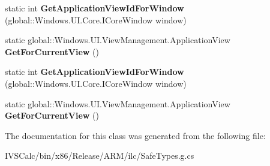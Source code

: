 \begin{DoxyCompactItemize}
\item 
\mbox{\label{class_windows_1_1_u_i_1_1_view_management_1_1_application_view_a676c20afecc52a042bd74db84f154257}} 
static int {\bfseries Get\+Application\+View\+Id\+For\+Window} (global\+::\+Windows.\+U\+I.\+Core.\+I\+Core\+Window window)
\item 
\mbox{\label{class_windows_1_1_u_i_1_1_view_management_1_1_application_view_a0d3252d3db6f56163e9ca7abe9623c21}} 
static global\+::\+Windows.\+U\+I.\+View\+Management.\+Application\+View {\bfseries Get\+For\+Current\+View} ()
\item 
\mbox{\label{class_windows_1_1_u_i_1_1_view_management_1_1_application_view_a676c20afecc52a042bd74db84f154257}} 
static int {\bfseries Get\+Application\+View\+Id\+For\+Window} (global\+::\+Windows.\+U\+I.\+Core.\+I\+Core\+Window window)
\item 
\mbox{\label{class_windows_1_1_u_i_1_1_view_management_1_1_application_view_a0d3252d3db6f56163e9ca7abe9623c21}} 
static global\+::\+Windows.\+U\+I.\+View\+Management.\+Application\+View {\bfseries Get\+For\+Current\+View} ()
\end{DoxyCompactItemize}


The documentation for this class was generated from the following file\+:\begin{DoxyCompactItemize}
\item 
I\+V\+S\+Calc/bin/x86/\+Release/\+A\+R\+M/ilc/Safe\+Types.\+g.\+cs\end{DoxyCompactItemize}
